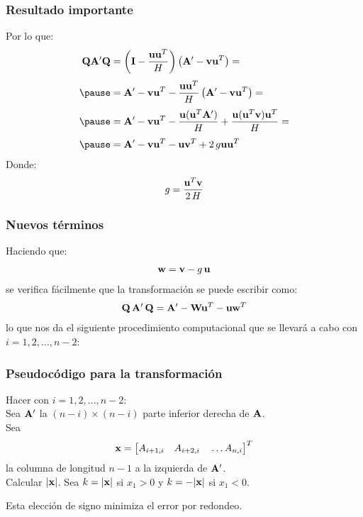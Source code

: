\documentclass[12pt]{beamer}
\begin{document}
\begin{frame}
\frametitle{Resultado importante}
Por lo que:
\begin{eqnarray*}
\begin{aligned}
\vb{Q} \pderivada{\vb{A}} \vb{Q} &= \left( \vb{I} - \dfrac{\vb{u} \vb{u}^{T}}{H} \right) \big( \pderivada{\vb{A}} - \vb{v} \vb{u}^{T} \big) = \\[0.3em] \pause
&= \pderivada{\vb{A}} - \vb{v} \vb{u}^{T} - \dfrac{\vb{u} \vb{u}^{T}}{H} \left( \pderivada{\vb{A}} - \vb{v} \vb{u}^{T} \right) = \\[0.3em] \pause
&= \pderivada{\vb{A}} - \vb{v} \vb{u}^{T} - \dfrac{\vb{u} ( \vb{u}^{T} \pderivada{\vb{A}})}{H} + \dfrac{\vb{u} ( \vb{u}^{T} \vb{v}) \vb{u}^{T}}{H} = \\[0.35em] \pause
&= \pderivada{\vb{A}} - \vb{v} \vb{u}^{T} - \vb{u} \vb{v}^{T} + 2 \, g \vb{u} \vb{u}^{T}
\end{aligned}
\end{eqnarray*}
\pause
Donde:
\pause
\begin{align}
g = \dfrac{\vb{u}^{T} \vb{v}}{2 \, H}
\label{eq:ecuacion_09_44}
\end{align}
\end{frame}
\begin{frame}
\frametitle{Nuevos términos}
Haciendo que:
\pause
\begin{align}
\vb{w} =  \vb{v} - g \, \vb{u}
\label{eq:ecuacion_09_45}
\end{align}
\pause
se verifica fácilmente que la transformación se puede escribir como:
\pause
\begin{align}
\vb{Q} \, {\vb{A}}^{\prime} \, \vb{Q} = {\vb{A}}^{\prime} - \vb{W} \vb{u}^{T} - \vb{u} \vb{w}^{T}
\label{eq:ecuacion_09_46}
\end{align}
lo que nos da el siguiente procedimiento computacional que se llevará a cabo con $i = 1, 2, \ldots, n - 2$:
\end{frame}
\begin{frame}
\frametitle{Pseudocódigo para la transformación}
\begin{tcolorbox}[colback=melon, title=Procedimiento para la reducción]
Hacer con $i = 1, 2, \ldots, n - 2$: \\ \pause
\hspace{1cm} Sea ${\vb{A}}^{\prime}$ la $(n - i) \times (n - i)$ parte inferior derecha de $\vb{A}$. \\ \pause
\hspace{1cm} Sea 
\[ \vb{x} = \big[ A_{i+1, i} \quad A_{i+2, i} \quad \ldots A_{n, i} \big]^{T} \]
la columna de longitud $n-1$ a la izquierda de ${\vb{A}}^{\prime}$. \\ \pause
\hspace{1cm} Calcular $\abs{\vb{x}}$. Sea $k = \abs{\vb{x}}$ si $x_{1} > 0$ y $k = - \abs{\vb{x}}$ si $x_{1} < 0$.

Esta elección de signo minimiza el error por redondeo.
\end{tcolorbox}
\end{frame}
\end{document}
